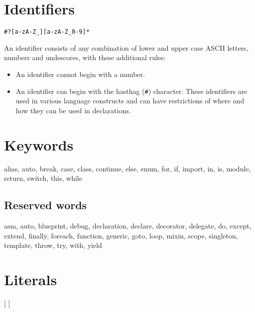 \section{Identifiers}
\begin{grammar}
	 \verb|#?[a-zA-Z_][a-zA-Z_0-9]*|
\end{grammar}
An identifier consists of any combination of lower and upper case ASCII letters, numbers and undescores, with these additional rules:
\begin{itemize}
	\item An identifier cannot begin with a number.
	\item An identifier can begin with the hasthag (\verb|#|) character. These identifiers are used in various language constructs and can have restrictions of where and how they can be used in declarations.
\end{itemize}

\section{Keywords} \label{keywords}
\begin{code}
alias, auto, break, case, class, continue, else, enum, for, if, import, in, is, module, return, switch, this, while
\end{code}

\subsection{Reserved words}
\begin{code}
asm, auto, blueprint, debug, declaration, declare, decorator, delegate, do, except, extend, finally, foreach, function, generic, goto, loop, mixin, scope, singleton, template, throw, try, with, yield
\end{code}

\section{Literals}
\begin{grammar}
	  [  ] \\
	  \\
		\grAltLn {} \\
		\grAltLn {} \\
		\grAltLn {} \\
		\grAltLn {} \\
		\grAltLn {} \\
\end{grammar}


